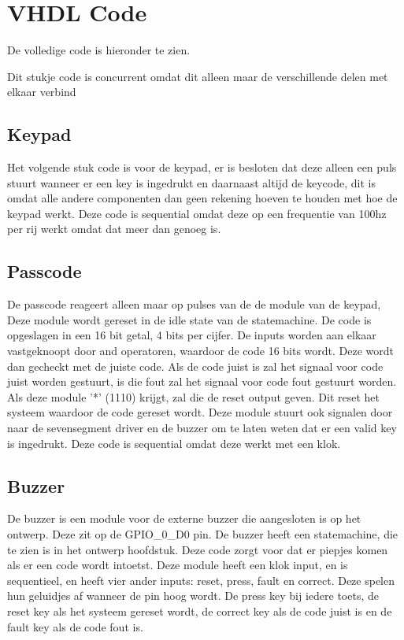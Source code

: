 \section{VHDL Code}
De volledige code is hieronder te zien.

Dit stukje code is concurrent omdat dit alleen maar de verschillende delen met elkaar verbind

\newpage
\subsection{Keypad}
Het volgende stuk code is voor de keypad, er is besloten dat deze alleen een puls stuurt wanneer er een key is ingedrukt en daarnaast altijd de keycode, dit is omdat alle andere componenten dan geen rekening hoeven te houden met hoe de keypad werkt. Deze code is sequential omdat deze op een frequentie van 100hz per rij werkt omdat dat meer dan genoeg is.


\newpage
\subsection{Passcode}
De passcode reageert alleen maar op pulses van de de module van de keypad, Deze module wordt gereset in de idle state van de statemachine. De code is opgeslagen in een 16 bit getal, 4 bits per cijfer. De inputs worden aan elkaar vastgeknoopt door and operatoren, waardoor de code 16 bits wordt. Deze wordt dan gecheckt met de juiste code. Als de code juist is zal het signaal voor code juist worden gestuurt, is die fout zal het signaal voor code fout gestuurt worden. Als deze module '*' (1110) krijgt, zal die de reset output geven. Dit reset het systeem waardoor de code gereset wordt. Deze module stuurt ook signalen door naar de sevensegment driver en de buzzer om te laten weten dat er een valid key is ingedrukt. Deze code is sequential omdat deze werkt met een klok.



\newpage
\subsection{Buzzer}
De buzzer is een module voor de externe buzzer die aangesloten is op het ontwerp. Deze zit op de GPIO\_0\_D0 pin. De buzzer heeft een statemachine, die te zien is in het ontwerp hoofdstuk. Deze code zorgt voor dat er piepjes komen als er een code wordt intoetst. Deze module heeft een klok input, en is sequentieel, en heeft vier ander inputs: reset, press, fault en correct. Deze spelen hun geluidjes af wanneer de pin hoog wordt. De press key bij iedere toets, de reset key als het systeem gereset wordt, de correct key als de code juist is en de fault key als de code fout is.

